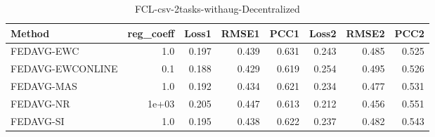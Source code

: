 \begin{table}
\caption{FCL-csv-2tasks-withaug-Decentralized}
\begin{tabular}{lrrrrrrr}
\toprule
Method & reg_coeff & Loss1 & RMSE1 & PCC1 & Loss2 & RMSE2 & PCC2 \\
\midrule
FEDAVG-EWC & 1.0 & 0.197 & 0.439 & 0.631 & 0.243 & 0.485 & 0.525 \\
FEDAVG-EWCONLINE & 0.1 & 0.188 & 0.429 & 0.619 & 0.254 & 0.495 & 0.526 \\
FEDAVG-MAS & 1.0 & 0.192 & 0.434 & 0.621 & 0.234 & 0.477 & 0.531 \\
FEDAVG-NR & 1e+03 & 0.205 & 0.447 & 0.613 & 0.212 & 0.456 & 0.551 \\
FEDAVG-SI & 1.0 & 0.195 & 0.438 & 0.622 & 0.237 & 0.482 & 0.543 \\
\bottomrule
\end{tabular}
\end{table}
